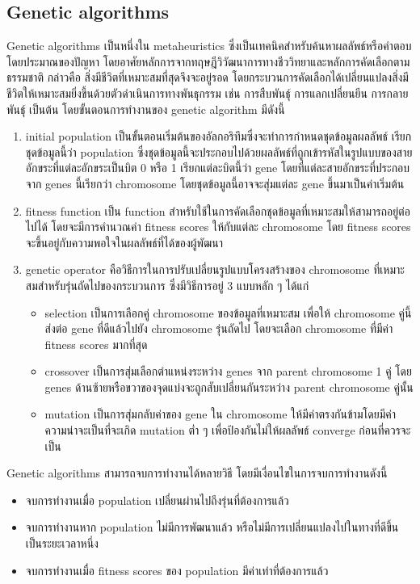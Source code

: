 \subsection{Genetic algorithms}
Genetic algorithms เป็นหนึ่งใน metaheuristics ซึ่งเป็นเทคนิคสำหรับค้นหาผลลัพธ์หรือคำตอบโดยประมาณของปัญหา โดยอาศัยหลักการจากทฤษฎีวิวัฒนาการทางชีววิทยาและหลักการคัดเลือกตามธรรมชาติ 
\linebreak กล่าวคือ สิ่งมีชีวิตที่เหมาะสมที่สุดจึงจะอยู่รอด \cite{ga} โดยกระบวนการคัดเลือกได้เปลี่ยนแปลงสิ่งมีชีวิตให้เหมาะสมยิ่งขึ้นด้วยตัวดำเนินการทางพันธุกรรม เช่น การสืบพันธุ์ การแลกเปลี่ยนยีน การกลายพันธุ์ เป็นต้น โดยขั้นตอนการทำงานของ genetic algorithm มีดังนี้ 
\begin{enumerate}
  \item initial population เป็นขั้นตอนเริ่มต้นของอัลกอริทึมซึ่งจะทำการกำหนดชุดข้อมูลผลลัพธ์ เรียกชุดข้อมูลนี้ว่า population ซึ่งชุดข้อมูลนี้จะประกอบไปด้วยผลลัพธ์ที่ถูกเข้ารหัสในรูปแบบของสายอักขระที่แต่ละอักขระเป็นบิต 0 หรือ 1 เรียกแต่ละบิตนี้ว่า gene
  โดยที่แต่ละสายอักขระที่ประกอบจาก genes นี้เรียกว่า chromosome โดยชุดข้อมูลนี้อาจจะสุ่มแต่ละ gene ขึ้นมาเป็นค่าเริ่มต้น
  \item fitness function เป็น function สำหรับใช้ในการคัดเลือกชุดข้อมูลที่เหมาะสมให้สามารถอยู่ต่อไปได้ โดยจะมีการคำนวณค่า fitness scores ให้กับแต่ละ chromosome
  โดย fitness scores จะขึ้นอยู่กับความพอใจในผลลัพธ์ที่ได้ของผู้พัฒนา
  \item genetic operator คือวิธีการในการปรับเปลี่ยนรูปแบบโครงสร้างของ chromosome ที่เหมาะสมสำหรับรุ่นถัดไปของกระบวนการ ซึ่งมีวิธีการอยู่ 3 แบบหลัก ๆ ได้แก่
  \begin{itemize}
  \item selection เป็นการเลือกคู่ chromosome ของข้อมูลที่เหมาะสม เพื่อให้ chromosome คู่นี้ส่งต่อ gene ที่ดีแล้วไปยัง chromosome รุ่นถัดไป โดยจะเลือก chromosome ที่มีค่า fitness scores มากที่สุด
  \item crossover เป็นการสุ่มเลือกตำแหน่งระหว่าง genes จาก parent chromosome 1 คู่ โดย genes ด้านซ้ายหรือขวาของจุดแบ่งจะถูกสับเปลี่ยนกันระหว่าง parent chromosome คู่นั้น
  \item mutation เป็นการสุ่มกลับค่าของ gene ใน chromosome ให้มีค่าตรงกันข้ามโดยมีค่าความน่าจะเป็นที่จะเกิด mutation ต่ำ ๆ เพื่อป้องกันไม่ให้ผลลัพธ์ converge ก่อนที่ควรจะเป็น
\end{itemize}
\end{enumerate}
Genetic algorithms สามารถจบการทำงานได้หลายวิธี โดยมีเงื่อนไขในการจบการทำงานดังนี้
\begin{itemize}
  \item จบการทำงานเมื่อ population เปลี่ยนผ่านไปถึงรุ่นที่ต้องการแล้ว 
  \item จบการทำงานหาก population ไม่มีการพัฒนาแล้ว หรือไม่มีการเปลี่ยนแปลงไปในทางที่ดีขึ้นเป็นระยะเวลาหนึ่ง
  \item จบการทำงานเมื่อ fitness scores ของ population มีค่าเท่าที่ต้องการแล้ว
\end{itemize}
